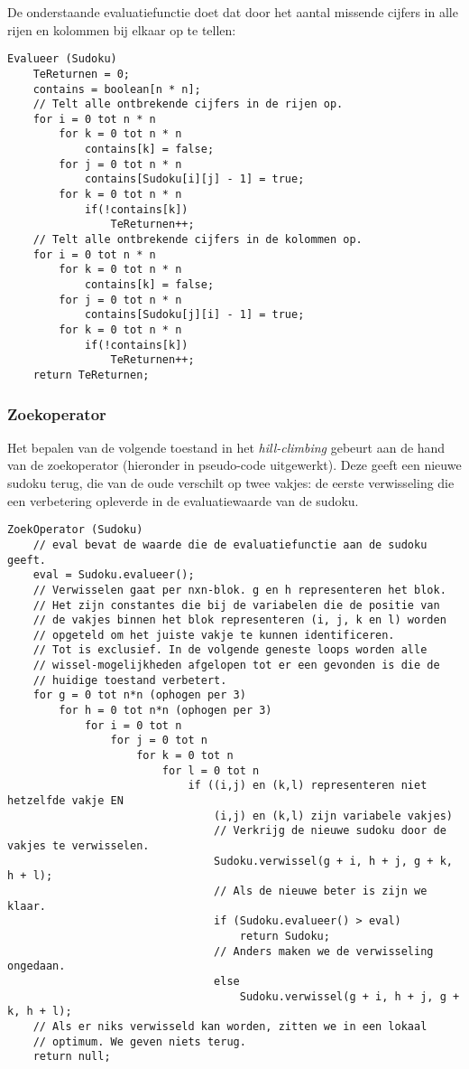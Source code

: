 \documentclass[]{report}
\begin{document}
De onderstaande evaluatiefunctie doet dat door het aantal missende cijfers in alle rijen en kolommen bij elkaar op te tellen:

\begin{minipage}{\textwidth}
\begin{lstlisting}
Evalueer (Sudoku)
	TeReturnen = 0;
	contains = boolean[n * n];
	// Telt alle ontbrekende cijfers in de rijen op.
	for i = 0 tot n * n
		for k = 0 tot n * n 
			contains[k] = false;
		for j = 0 tot n * n
			contains[Sudoku[i][j] - 1] = true;
		for k = 0 tot n * n
			if(!contains[k]) 
				TeReturnen++;
	// Telt alle ontbrekende cijfers in de kolommen op.
	for i = 0 tot n * n
		for k = 0 tot n * n
			contains[k] = false;
		for j = 0 tot n * n
			contains[Sudoku[j][i] - 1] = true;
		for k = 0 tot n * n
			if(!contains[k]) 
				TeReturnen++;
	return TeReturnen;
\end{lstlisting}
\end{minipage}

\subsubsection{Zoekoperator}
Het bepalen van de volgende toestand in het \textit{hill-climbing} gebeurt aan de hand van de zoekoperator (hieronder in pseudo-code uitgewerkt). Deze geeft een nieuwe sudoku terug, die van de oude verschilt op twee vakjes: de eerste verwisseling die een verbetering opleverde in de evaluatiewaarde van de sudoku.

\begin{minipage}{\textwidth}
\begin{lstlisting}
ZoekOperator (Sudoku)
	// eval bevat de waarde die de evaluatiefunctie aan de sudoku geeft.
	eval = Sudoku.evalueer();
	// Verwisselen gaat per nxn-blok. g en h representeren het blok.
	// Het zijn constantes die bij de variabelen die de positie van
	// de vakjes binnen het blok representeren (i, j, k en l) worden
	// opgeteld om het juiste vakje te kunnen identificeren.
	// Tot is exclusief. In de volgende geneste loops worden alle
	// wissel-mogelijkheden afgelopen tot er een gevonden is die de
	// huidige toestand verbetert.
	for g = 0 tot n*n (ophogen per 3) 
		for h = 0 tot n*n (ophogen per 3)
			for i = 0 tot n 
				for j = 0 tot n
					for k = 0 tot n
						for l = 0 tot n
							if ((i,j) en (k,l) representeren niet hetzelfde vakje EN
							    (i,j) en (k,l) zijn variabele vakjes)
								// Verkrijg de nieuwe sudoku door de vakjes te verwisselen.
								Sudoku.verwissel(g + i, h + j, g + k, h + l);
								// Als de nieuwe beter is zijn we klaar.
								if (Sudoku.evalueer() > eval) 
									return Sudoku;
								// Anders maken we de verwisseling ongedaan.
								else
									Sudoku.verwissel(g + i, h + j, g + k, h + l);
	// Als er niks verwisseld kan worden, zitten we in een lokaal
	// optimum. We geven niets terug.
	return null;
\end{lstlisting}
\end{minipage}
\end{document}
